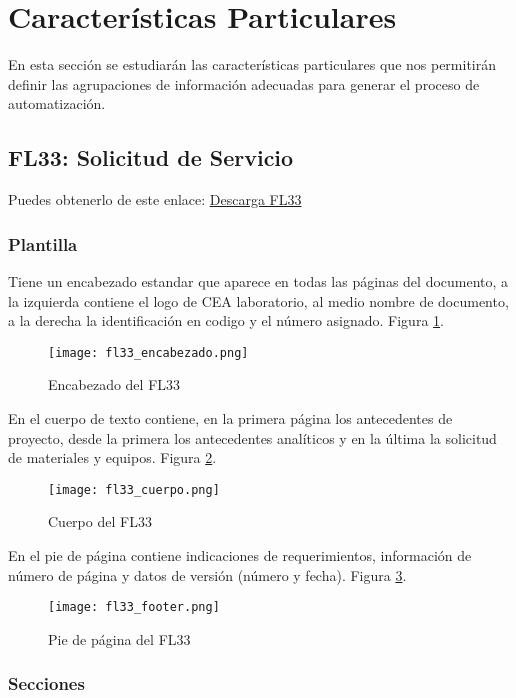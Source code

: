 \section*{Características Particulares}

En esta sección se estudiarán las características particulares que nos permitirán definir las agrupaciones de información adecuadas para generar el proceso de automatización.

\subsection*{FL33: Solicitud de Servicio}

Puedes obtenerlo de este enlace: \href{https://www.mediafire.com/?9e5cemqvsqo31a4}{Descarga FL33}

\subsubsection{Plantilla}

Tiene un encabezado estandar que aparece en todas las páginas del documento, a la izquierda contiene el logo de CEA laboratorio, al medio nombre de documento, a la derecha la identificación en codigo y el número asignado. Figura \ref{encabezado_fl33}.

\begin{figure}
	\centering
	\texttt{[image: fl33\_encabezado.png]}
	\caption{Encabezado del FL33}
	\label{encabezado_fl33}
\end{figure}

En el cuerpo de texto contiene, en la primera página los antecedentes de proyecto, desde la primera los antecedentes analíticos y en la última la solicitud de materiales y equipos. Figura \ref{cuerpo_fl33}.

\begin{figure}
	\centering
	\texttt{[image: fl33\_cuerpo.png]}
	\caption{Cuerpo del FL33}
	\label{cuerpo_fl33}
\end{figure}

En el pie de página contiene indicaciones de requerimientos, información de número de página y datos de versión (número y fecha). Figura \ref{footer_fl33}.

\begin{figure}
	\centering
	\texttt{[image: fl33\_footer.png]}
	\caption{Pie de página del FL33}
	\label{footer_fl33}
\end{figure}

\subsubsection{Secciones}

